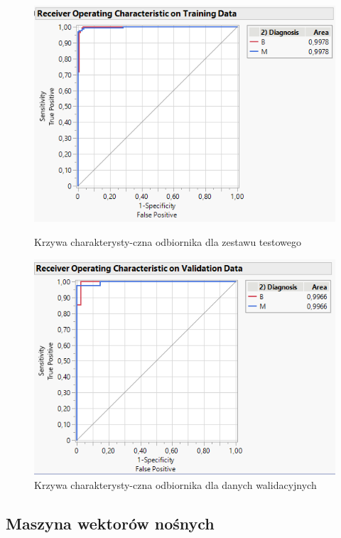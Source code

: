 \begin{figure}[!ht]
	\begin{minipage}{0.48\textwidth}
			\centering
			\includegraphics[width=0.95\linewidth]{Rozdzial3/roc_test}
			\caption{Krzywa charakterysty-czna odbiornika dla zestawu testowego}
			\label{fig:roctest}
	\end{minipage}%
	\hspace{8pt}
	\begin{minipage}{0.48\textwidth}
			\centering
			\includegraphics[width=0.95\linewidth]{Rozdzial3/roc_valid}
			\caption{Krzywa charakterysty-czna odbiornika dla danych walidacyjnych}
			\label{fig:rocvalid}
	\end{minipage}
\end{figure}

\subsection{Maszyna wektorów nośnych}

